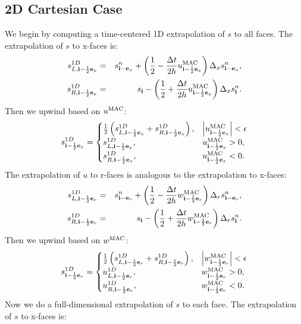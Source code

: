 \documentclass[11pt]{article}
\def\half  {\frac{1}{2}}
\def\dt    {\Delta t}
\def\mac   {\rm MAC}
\def\eb    {{\bf e}}
\def\ib    {{\bf i}}
\begin{document}
\subsection{2D Cartesian Case}
We begin by computing a time-centered 1D extrapolation of $s$ to all faces.  The extrapolation of $s$ to x-faces is:
\begin{eqnarray}
s_{L,\ib-\half\eb_x}^{1D} &=& s_{\ib-\eb_x}^n + \left(\half - \frac{\dt}{2h}u_{\ib-\half\eb_x}^{\mac}\right)\Delta_x s_{\ib-\eb_x}^n, \\
s_{R,\ib-\half\eb_x}^{1D} &=& s_{\ib} - \left(\half + \frac{\dt}{2h}u_{\ib-\half\eb_x}^{\mac}\right)\Delta_x s_{\ib}^n.
\end{eqnarray}
Then we upwind based on $u^{\mac}$:
\begin{equation}
s_{\ib-\half\eb_x}^{1D} =
\begin{cases}
\half\left(s_{L,\ib-\half\eb_x}^{1D} + s_{R,\ib-\half\eb_x}^{1D}\right), & \left|u^{\mac}_{\ib-\half\eb_x}\right| < \epsilon \\
s_{L,\ib-\half\eb_x}^{1D}, & u^{\mac}_{\ib-\half\eb_x} > 0, \\
s_{R,\ib-\half\eb_x}^{1D}, & u^{\mac}_{\ib-\half\eb_x} < 0. \\
\end{cases}
\end{equation}
The extrapolation of $u$ to r-faces is analogous to the extrapolation to x-faces:
\begin{eqnarray}
s_{L,\ib-\half\eb_r}^{1D} &=& s_{\ib-\eb_r}^n + \left(\half - \frac{\dt}{2h}w_{\ib-\half\eb_r}^{\mac}\right)\Delta_r s_{\ib-\eb_r}^n, \\
s_{R,\ib-\half\eb_r}^{1D} &=& s_{\ib} - \left(\half + \frac{\dt}{2h}w_{\ib-\half\eb_r}^{\mac}\right)\Delta_r s_{\ib}^n.
\end{eqnarray}
Then we upwind based on $w^{\mac}$:
\begin{equation}
s_{\ib-\half\eb_r}^{1D} =
\begin{cases}
\half\left(s_{L,\ib-\half\eb_r}^{1D} + s_{R,\ib-\half\eb_r}^{1D}\right), & \left|w^{\mac}_{\ib-\half\eb_r}\right| < \epsilon \\
u_{L,\ib-\half\eb_r}^{1D}, & w^{\mac}_{\ib-\half\eb_r} > 0, \\
u_{R,\ib-\half\eb_r}^{1D}, & w^{\mac}_{\ib-\half\eb_r} < 0. \\
\end{cases}
\end{equation}
Now we do a full-dimensional extrapolation of $s$ to each face.  The extrapolation of $s$ to x-faces is:
\end{document}
